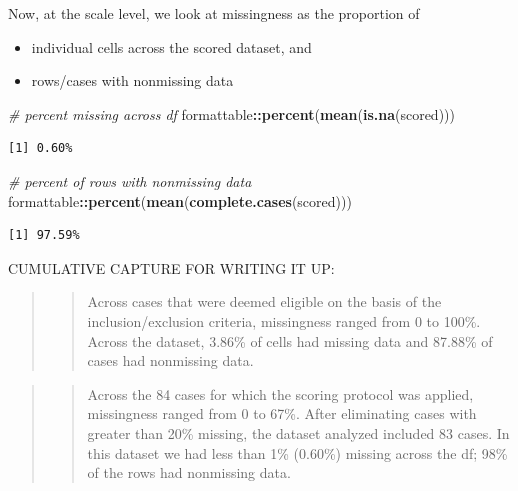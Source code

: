 \documentclass[
  11pt,
]{book}
\newenvironment{Shaded}{\begin{snugshade}}{\end{snugshade}}
\newcommand{\CommentTok}[1]{\textcolor[rgb]{0.37,0.37,0.37}{\textit{#1}}}
\newcommand{\FunctionTok}[1]{\textcolor[rgb]{0.27,0.27,0.27}{\textbf{#1}}}
\newcommand{\NormalTok}[1]{#1}
\newcommand{\SpecialCharTok}[1]{\textcolor[rgb]{0.43,0.43,0.43}{\textbf{#1}}}
\providecommand{\tightlist}{%
  \setlength{\itemsep}{0pt}\setlength{\parskip}{0pt}}
\begin{document}
Now, at the scale level, we look at missingness as the proportion of

\begin{itemize}
\tightlist
\item
  individual cells across the scored dataset, and
\item
  rows/cases with nonmissing data
\end{itemize}

\begin{Shaded}
\begin{Highlighting}[]
\CommentTok{\# percent missing across df}
\NormalTok{formattable}\SpecialCharTok{::}\FunctionTok{percent}\NormalTok{(}\FunctionTok{mean}\NormalTok{(}\FunctionTok{is.na}\NormalTok{(scored)))}
\end{Highlighting}
\end{Shaded}

\begin{verbatim}
[1] 0.60%
\end{verbatim}

\begin{Shaded}
\begin{Highlighting}[]
\CommentTok{\# percent of rows with nonmissing data}
\NormalTok{formattable}\SpecialCharTok{::}\FunctionTok{percent}\NormalTok{(}\FunctionTok{mean}\NormalTok{(}\FunctionTok{complete.cases}\NormalTok{(scored)))}
\end{Highlighting}
\end{Shaded}

\begin{verbatim}
[1] 97.59%
\end{verbatim}

CUMULATIVE CAPTURE FOR WRITING IT UP:

\begin{quote}
\begin{quote}
Across cases that were deemed eligible on the basis of the inclusion/exclusion criteria, missingness ranged from 0 to 100\%. Across the dataset, 3.86\% of cells had missing data and 87.88\% of cases had nonmissing data.
\end{quote}
\end{quote}

\begin{quote}
\begin{quote}
Across the 84 cases for which the scoring protocol was applied, missingness ranged from 0 to 67\%. After eliminating cases with greater than 20\% missing, the dataset analyzed included 83 cases. In this dataset we had less than 1\% (0.60\%) missing across the df; 98\% of the rows had nonmissing data.
\end{quote}
\end{quote}
\end{document}
